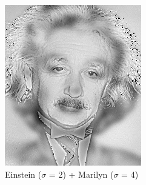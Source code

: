 \documentclass{article}
\begin{document}
\begin{minipage}{\linewidth}
\begin{minipage}{0.45\linewidth}
\begin{figure}[H]
			\includegraphics[width=\linewidth]{Ejercicio3/hybrid2.png}          
			\caption{Einstein ($\sigma$ = 2) + Marilyn ($\sigma$ = 4)}
		\end{figure}
    \end{minipage}
    

\end{minipage}
\end{document}
